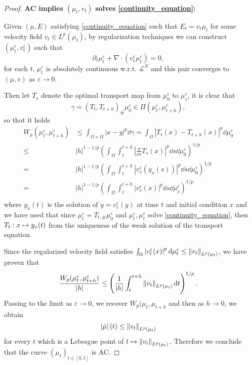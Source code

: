 \begin{proof}
	{\bf AC implies $(\mu_t, v_t)$ solves \eqref{continuity_equation}:}
	
	Given $(\mu, E)$ satisfying \eqref{continuity_equation} such that $E_t = v_t\mu_t$ for some velocity field $v_t \in L^p(\mu_t)$, by regularization techniques we can construct $(\mu^{\varepsilon}_t, v^{\varepsilon}_t)$ such that
	$$
		\partial_t\mu^{\varepsilon}_t + \nabla\cdot\left(v^{\varepsilon}_t\mu^{\varepsilon}_t\right) = 0,
	$$
	for each $t$, $\mu^{\varepsilon}_t$ is absolutely continuous w.r.t. $\mathcal{L}^N$ and this pair converges to $(\mu, v)$ as $\varepsilon \to 0$. 
	
	Then let $T_s$ denote the optimal transport map from $\mu^{\varepsilon}_0$ to $\mu^{\varepsilon}_s$, it is clear that 
	$$
		\gamma = (T_t, T_{t+h})_{\#}\mu^{\varepsilon}_0 \in \Pi(\mu^{\varepsilon}_t, \mu^{\varepsilon}_{t+h}),
	$$
	so that it holds 
	\begin{align*}
		W_p(\mu^{\varepsilon}_t, \mu^{\varepsilon}_{t+h}) 
		&\le
		\int_{\Omega\times\Omega} |x -y|^p\dd\gamma =  \int_{\Omega} \left|T_t(x) - T_{t+h}(x)\right|^p\dd\mu^{\varepsilon}_0\\
		\le&
		|h|^{1 - 1/p}
		\left(
		\int_{\Omega} \int_t^{t+h}\left|\frac{\dd}{\dd s}T_s(x)\right|^p\dd s\dd\mu^{\varepsilon}_0
		\right)^{1/p}\\
		=&
		|h|^{1 - 1/p}
		\left(
		\int_{\Omega} \int_t^{t+h}\left|v^{\varepsilon}_s(y_x(s))\right|^p\dd s\dd\mu^{\varepsilon}_0
		\right)^{1/p}\\
		=&
		|h|^{1 - 1/p}
		\left(
		\int_{\Omega} \int_t^{t+h}\left|v^{\varepsilon}_s(x)\right|^p\dd s\dd\mu^{\varepsilon}_s
		\right)^{1/p}\\
	\end{align*}
	where $y_x(t)$ is the solution of $\dot{y} = v^{\varepsilon}_t(y)$ at time $t$ and initial condition $x$ and we have used that since $\mu^{\varepsilon}_t = T_{t,\#}\mu^{\varepsilon}_0$ and $\mu^{\varepsilon}_t, \mu^{\varepsilon}_t$ solve \eqref{continuity_equation}, then $\displaystyle T_t: x\mapsto y_x(t)$ from the uniqueness of the weak solution of the transport equation. 
	
	Since the regularized velocity field satisfies $\int_{\Omega} \left|v^{\varepsilon}_t(x)\right|^p{\rm d}\mu^{\varepsilon}_t \le \left\lVert v_t\right\rVert_{L^p(\mu_t)}$, we have proven that
	$$
	\frac{W_p(\mu^{\varepsilon}_t, \mu^{\varepsilon}_{t+h})}{|h|} 
	\le 
	\left(
	\frac{1}{|h|}
	 \int_t^{t+h}
	 \left\lVert v_t\right\rVert_{L^p(\mu_t)}{\rm d} t
	\right)^{1/p}.
	$$
	Passing to the limit as $\varepsilon \to 0$, we recover $W_p(\mu_t, \mu_{t+h}$ and then as $h \to 0$, we obtain 
	\begin{equation*}
		\left|\dot{\mu}\right|(t) \le \left\lVert v_t\right\rVert_{L^p(\mu_t)}
	\end{equation*}
	for every $t$ which is a Lebesgue point of $t \mapsto \displaystyle \left\lVert v_t\right\rVert_{L^p(\mu_t)}$. Therefore we conclude that the curve $(\mu_t)_{t \in [0,1]}$ is AC. 
\end{proof}

